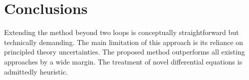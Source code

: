 \section{Conclusions}\label{sec:conclusions}

Extending the method beyond two loops is conceptually straightforward
but technically demanding. The main limitation of this approach is its
reliance on principled theory uncertainties. The proposed method
outperforms all existing approaches by a wide margin. The treatment of
novel differential equations is admittedly heuristic.

